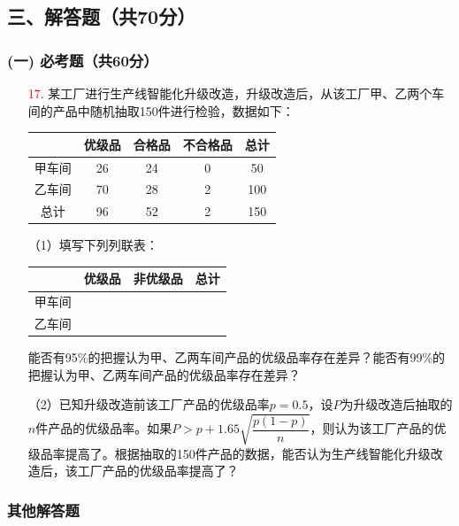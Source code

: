 \documentclass[12pt]{ctexart}
\begin{document}
\subsection*{三、解答题（共70分）}

\subsubsection*{(一) 必考题（共60分）}

\begin{enumerate}[resume*]
    \item[\textcolor{red}{17}.] 某工厂进行生产线智能化升级改造，升级改造后，从该工厂甲、乙两个车间的产品中随机抽取150件进行检验，数据如下：
    \begin{table}[H]
        \centering
        \begin{tabular}{c|c|c|c|c}
            \hline
            & 优级品 & 合格品 & 不合格品 & 总计 \\
            \hline
            甲车间 & 26 & 24 & 0 & 50 \\
            \hline
            乙车间 & 70 & 28 & 2 & 100 \\
            \hline
            总计 & 96 & 52 & 2 & 150 \\
            \hline
        \end{tabular}
    \end{table}
    （1）填写下列列联表：
    \begin{table}[H]
        \centering
        \begin{tabular}{c|c|c|c}
            \hline
            & 优级品 & 非优级品 & 总计 \\
            \hline
            甲车间 & & & \\
            \hline
            乙车间 & & & \\
            \hline
        \end{tabular}
    \end{table}
    能否有95\%的把握认为甲、乙两车间产品的优级品率存在差异？能否有99\%的把握认为甲、乙两车间产品的优级品率存在差异？
    
    （2）已知升级改造前该工厂产品的优级品率\( p = 0.5 \)，设\( P \)为升级改造后抽取的\( n \)件产品的优级品率。如果\( P > p + 1.65\sqrt{\dfrac{p(1-p)}{n}} \)，则认为该工厂产品的优级品率提高了。根据抽取的150件产品的数据，能否认为生产线智能化升级改造后，该工厂产品的优级品率提高了？
\end{enumerate}

\subsubsection*{其他解答题}
\end{document}

